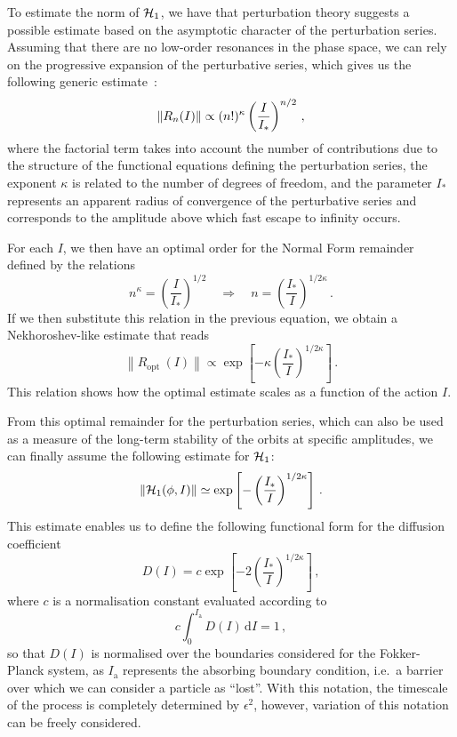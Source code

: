 To estimate the norm of $\mathcal{H}_1$, we have that perturbation theory suggests a possible estimate based on the asymptotic character of the perturbation series. Assuming that there are no low-order resonances in the phase space, we can rely on the progressive expansion of the perturbative series, which gives us the following generic estimate~\cite{Bazzani:1990aa}:
\begin{equation}
    \norm{R_n(I)} \propto (n!)^\kappa \left(\frac{I}{I_\ast}\right)^{n/2}\,,
\end{equation}
where the factorial term takes into account the number of contributions due to the structure of the functional equations defining the perturbation series, the exponent $\kappa$ is related to the number of degrees of freedom, and the parameter $I_\ast$ represents an apparent radius of convergence of the perturbative series and corresponds to the amplitude above which fast escape to infinity occurs.

For each $I$, we then have an optimal order for the Normal Form remainder defined by the relations
\begin{equation}
    n^\kappa=\left(\frac{I}{I_\ast}\right)^{1 / 2} \quad \Rightarrow \quad n=\left(\frac{I_\ast}{I}\right)^{1 / 2 \kappa} \,.
\end{equation}
If we then substitute this relation in the previous equation, we obtain a Nekhoroshev-like estimate that reads
\begin{equation}
    \left\|R_{\text {opt }}(I)\right\| \propto \exp \left[-\kappa\left(\frac{I_*}{I}\right)^{1 / 2 \kappa}\right] \,.
\end{equation}
This relation shows how the optimal estimate scales as a function of the action $I$. 

From this optimal remainder for the perturbation series, which can also be used as a measure of the long-term stability of the orbits at specific amplitudes, we can finally assume the following estimate for $\mathcal{H}_1$:
\begin{equation}
    \left\|\mathcal{H}_1(\phi, I)\right\| \simeq \exp \left[-\left(\frac{I_\ast}{I}\right)^{1/2\kappa}\right] \,.
\end{equation}
This estimate enables us to define the following functional form for the diffusion coefficient
\begin{equation}
    D(I) = c \exp\left[-2\left(\frac{I_\ast}{I}\right)^{1/2\kappa}\right]\,,
    \label{eq:diffusion}
\end{equation}
where $c$ is a normalisation constant evaluated according to
\begin{equation}
    c \int_0^{I_\text{a}} D(I)\,\mathrm{d}I = 1 \,,
\end{equation}
so that $D(I)$ is normalised over the boundaries considered for the Fokker-Planck system, as $I_\text{a}$ represents the absorbing boundary condition, i.e.\ a barrier over which we can consider a particle as ``lost''. With this notation, the timescale of the process is completely determined by $\epsilon^2$, however, variation of this notation can be freely considered.

